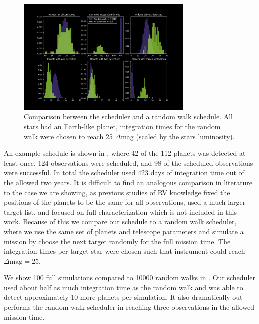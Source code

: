 \begin{figure}
  \begin{center}
    \includegraphics[width=0.75\textwidth]{ch4/figures/bexam_results.png}
  \end{center}
  \caption{Comparison between the scheduler and a random walk schedule.
  All stars had an Earth-like planet, integration times for the random
walk were chosen to reach 25 $\Delta$mag (scaled by the stars luminosity).}
  \label{fig:randomwalkhist}
\end{figure}

An example schedule is shown in , where 42 of the 112
planets was detected at least once, 124 observations were scheduled, and 98 of
the scheduled observations were successful. In total the scheduler used 423
days of integration time out of the allowed two years. It is difficult to find
an analogous comparison in literature to the case we are showing, as previous
studies of RV knowledge fixed the positions of the planets to be the same for
all observations, used a much larger target list, and focused on full
characterization which is not included in this
work\citep{morganExplorationExpectedNumber2022a}. Because of this we compare
our schedule to a random walk scheduler, where we use the same set of planets
and telescope parameters and simulate a mission by choose the next target
randomly for the full mission time. The integration times per target star were
chosen such that instrument could reach $\Delta\textrm{mag}=25$. 

We show 100 full simulations compared to 10000 random walks in 
. Our scheduler used about half as much integration
time as the random walk and was able to detect approximately 10 more planets
per simulation. It also dramatically out performs the random walk scheduler
in reaching three observations in the allowed mission time.

